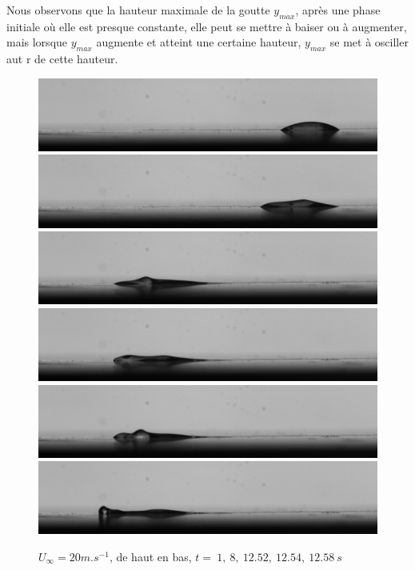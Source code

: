 \documentclass[french]{article}
\begin{document}
Nous observons que la hauteur maximale de la goutte $y_{max}$, après une phase initiale où elle est presque constante, elle peut se mettre à baiser ou à augmenter, mais lorsque $y_{max}$ augmente et atteint une certaine hauteur, $y_{max}$ se met à osciller aut
r de cette hauteur.
\begin{figure}[!ht]
		\includegraphics[width = \linewidth]{./image/test.jpg}
		\includegraphics[width = \linewidth]{./image/test400.jpg}
		\includegraphics[width = \linewidth]{./image/test626.jpg}
		\includegraphics[width = \linewidth]{./image/test627.jpg}
		\includegraphics[width = \linewidth]{./image/test628.jpg}
		\includegraphics[width = \linewidth]{./image/test629.jpg}
	\caption{$U_{\infty}=20m.s^{-1}$, de haut en bas, 
	$t = ~1,~8,~12.52,~12.54,~12.58~s$}
		\label{fig:test}
\end{figure}
\end{document}
